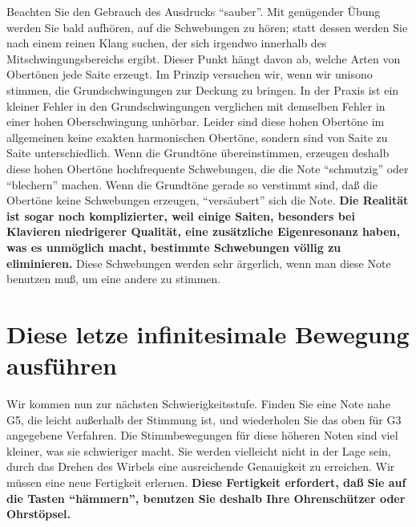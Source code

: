 Beachten Sie den Gebrauch des Ausdrucks \enquote{sauber}.
Mit genügender Übung werden Sie bald aufhören, auf die Schwebungen zu hören; statt dessen werden Sie nach einem reinen Klang suchen, der sich irgendwo innerhalb des Mitschwingungsbereichs ergibt.
Dieser Punkt hängt davon ab, welche Arten von Obertönen jede Saite erzeugt.
Im Prinzip versuchen wir, wenn wir unisono stimmen, die Grundschwingungen zur Deckung zu bringen.
In der Praxis ist ein kleiner Fehler in den Grundschwingungen verglichen mit demselben Fehler in einer hohen Oberschwingung unhörbar.
Leider sind diese hohen Obertöne im allgemeinen keine exakten harmonischen Obertöne, sondern sind von Saite zu Saite unterschiedlich.
Wenn die Grundtöne übereinstimmen, erzeugen deshalb diese hohen Obertöne hochfrequente Schwebungen, die die Note \enquote{schmutzig} oder \enquote{blechern} machen.
Wenn die Grundtöne gerade so verstimmt sind, daß die Obertöne keine Schwebungen erzeugen, \enquote{versäubert} sich die Note.
\textbf{Die Realität ist sogar noch komplizierter, weil einige Saiten, besonders bei Klavieren niedrigerer Qualität, eine zusätzliche Eigenresonanz haben, was es unmöglich macht, bestimmte Schwebungen völlig zu eliminieren.}
Diese Schwebungen werden sehr ärgerlich, wenn man diese Note benutzen muß, um eine andere zu stimmen.
 

\hypertarget{c2_5f}{}
\section{Diese letze infinitesimale Bewegung ausführen}\hypertarget{c2_5_infi}{}

Wir kommen nun zur nächsten Schwierigkeitsstufe.
Finden Sie eine Note nahe G5, die leicht außerhalb der Stimmung ist, und wiederholen Sie das oben für G3 angegebene Verfahren.
Die Stimmbewegungen für diese höheren Noten sind viel kleiner, was sie schwieriger macht.
Sie werden vielleicht nicht in der Lage sein, durch das Drehen des Wirbels eine ausreichende Genauigkeit zu erreichen.
Wir müssen eine neue Fertigkeit erlernen.
\textbf{Diese Fertigkeit erfordert, daß Sie auf die Tasten \enquote{hämmern}, benutzen Sie deshalb Ihre Ohrenschützer oder Ohrstöpsel.}

